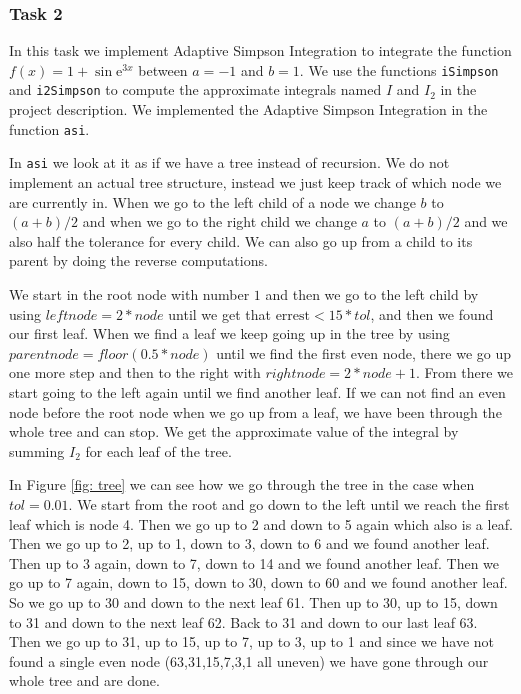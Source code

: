 \documentclass[a4paper,10pt]{article}
\newcommand{\e}{\text{e}}
\begin{document}
\FloatBarrier
\subsubsection*{Task 2}
In this task we implement Adaptive Simpson Integration to integrate the function $f(x) = 1 + \sin \e ^{3x}$ between $a=-1$ and $b=1$. We use the functions \texttt{iSimpson} and \texttt{i2Simpson} to compute the approximate integrals named $I$ and $I_2$ in the project description. We implemented the Adaptive Simpson Integration in the function \texttt{asi}.

In \texttt{asi} we look at it as if we have a tree instead of recursion. We do not implement an actual tree structure, instead we just keep track of which node we are currently in. When we go to the left child of a node we change $b$ to $(a+b)/2$ and when we go to the right child we change $a$ to $(a+b)/2$ and we also half the tolerance for every child. We can also go up from a child to its parent by doing the reverse computations.

We start in the root node with number $1$ and then we go to the left child by using $leftnode = 2*node$ until we get that $\text{errest}<15*tol$, and then we found our first leaf. When we find a leaf we keep going up in the tree by using $parentnode = floor(0.5 * node)$ until we find the first even node, there we go up one more step and then to the right with $rightnode = 2*node+1$. From there we start going to the left again until we find another leaf. If we can not find an even node before the root node when we go up from a leaf, we have been through the whole tree and can stop. We get the approximate value of the integral by summing $I_2$ for each leaf of the tree.

In Figure \ref{fig: tree} we can see how we go through the tree in the case when $tol=0.01$. We start from the root and go down to the left until we reach the first leaf which is node 4. Then we go up to 2 and down to 5 again which also is a leaf. Then we go up to 2, up to 1, down to 3, down to 6 and we found another leaf. Then up to 3 again, down to 7, down to 14 and we found another leaf. Then we go up to 7 again, down to 15, down to 30, down to 60 and we found another leaf. So we go up to 30 and down to the next leaf 61. Then up to 30, up to 15, down to 31 and down to the next leaf 62. Back to 31 and down to our last leaf 63. Then we go up to 31, up to 15, up to 7, up to 3, up to 1 and since we have not found a single even node (63,31,15,7,3,1 all uneven) we have gone through our whole tree and are done.
\end{document}
